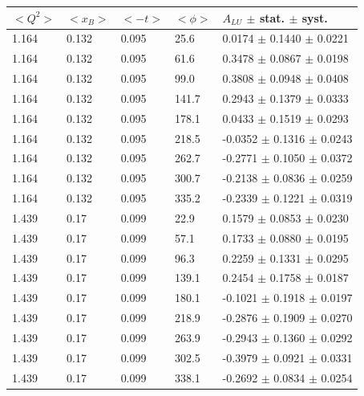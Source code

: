 \documentclass{article}
\begin{document}
\begin{table}[!h]
   \begin{center}
      \begin{tabular}{||l|l|l|l|l||}
         \hline
 $<Q^{2}>$ & $<x_{B}>$ & $<-t>$ & $<\phi>$ & $A_{LU}$ $\pm$ stat. $\pm$ syst.\\
         \hline

  1.164 & 0.132 & 0.095 & 25.6  &  0.0174 $\pm$ 0.1440 $\pm$ 0.0221 \\
  1.164 & 0.132 & 0.095 & 61.6  &  0.3478 $\pm$ 0.0867 $\pm$ 0.0198 \\
  1.164 & 0.132 & 0.095 & 99.0  &  0.3808 $\pm$ 0.0948 $\pm$ 0.0408 \\
  1.164 & 0.132 & 0.095 & 141.7 &  0.2943 $\pm$ 0.1379 $\pm$ 0.0333 \\
  1.164 & 0.132 & 0.095 & 178.1 &  0.0433 $\pm$ 0.1519 $\pm$ 0.0293 \\
  1.164 & 0.132 & 0.095 & 218.5 & -0.0352 $\pm$ 0.1316 $\pm$ 0.0243 \\
  1.164 & 0.132 & 0.095 & 262.7 & -0.2771 $\pm$ 0.1050 $\pm$ 0.0372 \\
  1.164 & 0.132 & 0.095 & 300.7 & -0.2138 $\pm$ 0.0836 $\pm$ 0.0259 \\
  1.164 & 0.132 & 0.095 & 335.2 & -0.2339 $\pm$ 0.1221 $\pm$ 0.0319 \\
   \hline                                                                                                         
  1.439 & 0.17 & 0.099 &  22.9  &  0.1579 $\pm$ 0.0853 $\pm$ 0.0230 \\
  1.439 & 0.17 & 0.099 &  57.1  &  0.1733 $\pm$ 0.0880 $\pm$ 0.0195 \\
  1.439 & 0.17 & 0.099 &  96.3  &  0.2259 $\pm$ 0.1331 $\pm$ 0.0295 \\
  1.439 & 0.17 & 0.099 &  139.1 &  0.2454 $\pm$ 0.1758 $\pm$ 0.0187 \\
  1.439 & 0.17 & 0.099 &  180.1 & -0.1021 $\pm$ 0.1918 $\pm$ 0.0197 \\
  1.439 & 0.17 & 0.099 &  218.9 & -0.2876 $\pm$ 0.1909 $\pm$ 0.0270 \\
  1.439 & 0.17 & 0.099 &  263.9 & -0.2943 $\pm$ 0.1360 $\pm$ 0.0292 \\
  1.439 & 0.17 & 0.099 &  302.5 & -0.3979 $\pm$ 0.0921 $\pm$ 0.0331 \\
  1.439 & 0.17 & 0.099 &  338.1 & -0.2692 $\pm$ 0.0834 $\pm$ 0.0254 \\
   \hline                                                                                                         

\end{tabular}
\end{center}
\end{table}
\end{document}
